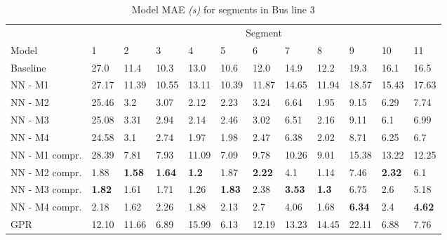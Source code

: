 \begin{table}[H]
  \centering
  \caption{Model MAE \textit{(s)} for segments in Bus line 3}
  \label{tbl:model-mae-of-segs-203}
  \begin{adjustbox}{center}
	\begin{tabular}{l|l|l|l|l|l|l|l|l|l|l|l}
		& \multicolumn{11}{c}{Segment}                                                                                                                                                  \\
Model          & 1             & 2             & 3             & 4            & 5             & 6             & 7             & 8            & 9             & 10            & 11              \\ 
\hline
Baseline       & 27.0          & 11.4          & 10.3          & 13.0         & 10.6          & 12.0          & 14.9          & 12.2         & 19.3          & 16.1          & 16.5            \\
NN - M1        & 27.17         & 11.39         & 10.55         & 13.11        & 10.39         & 11.87         & 14.65         & 11.94        & 18.57         & 15.43         & 17.63           \\
NN - M2        & 25.46         & 3.2           & 3.07          & 2.12         & 2.23          & 3.24          & 6.64          & 1.95         & 9.15          & 6.29          & 7.74            \\
NN - M3        & 25.08         & 3.31          & 2.94          & 2.14         & 2.46          & 3.02          & 6.51          & 2.16         & 9.11          & 6.1           & 6.99            \\
NN - M4        & 24.58         & 3.1           & 2.74          & 1.97         & 1.98          & 2.47          & 6.38          & 2.02         & 8.71          & 6.25          & 6.7             \\
NN - M1 compr. & 28.39         & 7.81          & 7.93          & 11.09        & 7.09          & 9.78          & 10.26         & 9.01         & 15.38         & 13.22         & 12.25           \\
NN - M2 compr. & 1.88          & \textbf{1.58}         & \textbf{1.64} & \textbf{1.2} & 1.87          & \textbf{2.22} & 4.1           & 1.14         & 7.46          & \textbf{2.32} & 6.1             \\
NN - M3 compr. & \textbf{1.82} & 1.61 & 1.71          & 1.26         & \textbf{1.83} & 2.38          & \textbf{3.53} & \textbf{1.3} & 6.75          & 2.6           & 5.18            \\
NN - M4 compr. & 2.18          & 1.62          & 2.26          & 1.88         & 2.13          & 2.7           & 4.06          & 1.68         & \textbf{6.34} & 2.4           & \textbf{4.62 }  \\
GPR            & 12.10         & 11.66         & 6.89          & 15.99        & 6.13          & 12.19         & 13.23         & 14.45        & 22.11         & 6.88          & 7.76           
\end{tabular}

  \end{adjustbox}
\end{table}

